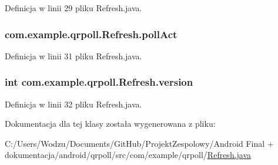 Definicja w linii 29 pliku Refresh.\+java.

\hypertarget{classcom_1_1example_1_1qrpoll_1_1_refresh_aa893ac7b613b4da5a7a29dfc3a1bea87}{
\subsubsection[{poll\+Act}]{ com.\+example.\+qrpoll.\+Refresh.\+poll\+Act\hspace{0.3cm}{\ttfamily [private]}}}\label{classcom_1_1example_1_1qrpoll_1_1_refresh_aa893ac7b613b4da5a7a29dfc3a1bea87}


Definicja w linii 31 pliku Refresh.\+java.

\hypertarget{classcom_1_1example_1_1qrpoll_1_1_refresh_ac9c9ddb92776f76a283dd629bf6acbf1}{
\subsubsection[{version}]{\setlength{\rightskip}{0pt plus 5cm}int com.\+example.\+qrpoll.\+Refresh.\+version\hspace{0.3cm}{\ttfamily [private]}}}\label{classcom_1_1example_1_1qrpoll_1_1_refresh_ac9c9ddb92776f76a283dd629bf6acbf1}


Definicja w linii 32 pliku Refresh.\+java.



Dokumentacja dla tej klasy została wygenerowana z pliku\+:\begin{DoxyCompactItemize}
\item 
C\+:/\+Users/\+Wodzu/\+Documents/\+Git\+Hub/\+Projekt\+Zespolowy/\+Android Final + dokumentacja/android/qrpoll/src/com/example/qrpoll/\hyperlink{_refresh_8java}{Refresh.\+java}\end{DoxyCompactItemize}
